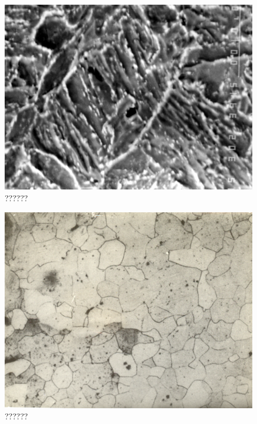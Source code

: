 \begin{figure}[H]
\renewcommand{\thefigure}{22B}
\includegraphics[scale=0.68]{images/chapter-4/fig022B.jpg}
\caption{??????}\label{chapter-4-fig22B}
\end{figure}

\begin{figure}[H]
\renewcommand{\thefigure}{23A}
\includegraphics[scale=0.78]{images/chapter-4/fig023A.jpg}
\caption{??????}\label{chapter-4-fig23A}
\end{figure}

\newpage


